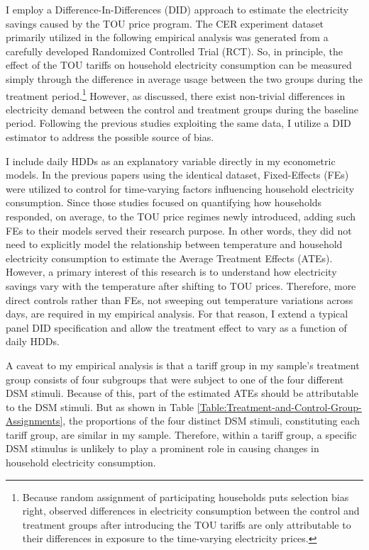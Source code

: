 I employ a Difference-In-Differences (DID) approach to estimate the electricity savings caused by the TOU price program. The CER experiment dataset primarily utilized in the following empirical analysis was generated from a carefully developed Randomized Controlled Trial (RCT). So, in principle, the effect of the TOU tariffs on household electricity consumption can be measured simply through the difference in average usage between the two groups during the treatment period.\footnote{Because random assignment of participating households puts selection bias right, observed differences in electricity consumption between the control and treatment groups after introducing the TOU tariffs are only attributable to their differences in exposure to the time-varying electricity prices.} However, as discussed, there exist non-trivial differences in electricity demand between the control and treatment groups during the baseline period. Following the previous studies exploiting the same data, I utilize a DID estimator to address the possible source of bias. 

I include daily HDDs as an explanatory variable directly in my econometric models. In the previous papers using the identical dataset, Fixed-Effects (FEs) were utilized to control for time-varying factors influencing household electricity consumption. Since those studies focused on quantifying how households responded, on average, to the TOU price regimes newly introduced, adding such FEs to their models served their research purpose. In other words, they did not need to explicitly model the relationship between temperature and household electricity consumption to estimate the Average Treatment Effects (ATEs). However, a primary interest of this research is to understand how electricity savings vary with the temperature after shifting to TOU prices. Therefore, more direct controls rather than FEs, not sweeping out temperature variations across days, are required in my empirical analysis. For that reason, I extend a typical panel DID specification and allow the treatment effect to vary as a function of daily HDDs.

A caveat to my empirical analysis is that a tariff group in my sample's treatment group consists of four subgroups that were subject to one of the four different DSM stimuli. Because of this, part of the estimated ATEs should be attributable to the DSM stimuli. But as shown in Table \ref{Table:Treatment-and-Control-Group-Assignments}, the proportions of the four distinct DSM stimuli, constituting each tariff group, are similar in my sample. Therefore, within a tariff group, a specific DSM stimulus is unlikely to play a prominent role in causing changes in household electricity consumption. 
